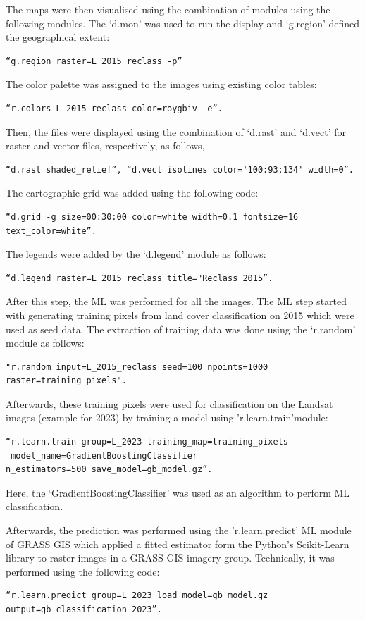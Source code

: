 \documentclass[jimaging,article,submit,pdftex,moreauthors]{Definitions/mdpi}
\begin{document}
The maps were then visualised using the combination of modules using the following modules. The ‘d.mon’ was used to run the display and ‘g.region’ defined the geographical extent: 
 \begin{verbatim}
“g.region raster=L_2015_reclass -p” 
\end{verbatim}

The color palette was assigned to the images using existing color tables: 
 \begin{verbatim}
“r.colors L_2015_reclass color=roygbiv -e”. 
\end{verbatim}
Then, the files were displayed using the combination of ‘d.rast’ and ‘d.vect’ for raster and vector files, respectively, as follows, 
 \begin{verbatim}
“d.rast shaded_relief”, “d.vect isolines color='100:93:134' width=0”. 
\end{verbatim}

The cartographic grid was added using the following code:  
\begin{verbatim}
“d.grid -g size=00:30:00 color=white width=0.1 fontsize=16 text_color=white”. 
\end{verbatim}
The legends were added by the ‘d.legend’ module as follows:

 \begin{verbatim}
“d.legend raster=L_2015_reclass title="Reclass 2015”. 
\end{verbatim}

After this step, the ML was performed for all the images. The ML step started with generating training pixels from land cover classification on 2015 which were used as seed data. The extraction of training data was done using the ‘r.random’ module as follows: 
 \begin{verbatim}
"r.random input=L_2015_reclass seed=100 npoints=1000 raster=training_pixels". 
\end{verbatim}
Afterwards, these training pixels were used for classification on the Landsat images (example for 2023) by training a model using 'r.learn.train'module: 
 \begin{verbatim}
“r.learn.train group=L_2023 training_map=training_pixels
 model_name=GradientBoostingClassifier 
n_estimators=500 save_model=gb_model.gz”. 
\end{verbatim}
Here, the ‘GradientBoostingClassifier’ was used as an algorithm to perform ML classification. 

Afterwards, the prediction was performed using the 'r.learn.predict' ML module of GRASS GIS which applied a fitted estimator form the Python's Scikit-Learn library \cite{pedregosa2018} to raster images in a GRASS GIS imagery group. Tcehnically, it was performed using the following code: 
 \begin{verbatim}
“r.learn.predict group=L_2023 load_model=gb_model.gz 
output=gb_classification_2023”. 
\end{verbatim}
\end{document}
